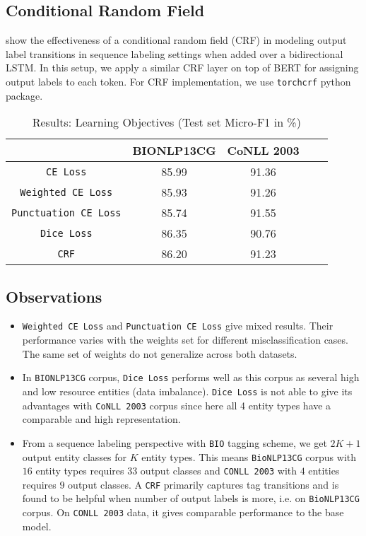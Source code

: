 \subsection{Conditional Random Field}
\cite{ma2016end} show the effectiveness of a conditional random field (CRF) in modeling output label transitions in sequence labeling settings when added over a bidirectional LSTM. In this setup, we apply a similar CRF layer on top of BERT for assigning output labels to each token. For CRF implementation, we use \texttt{torchcrf} python package.

\begin{table}[h!]
\centering
\begin{tabular}{|c|c|c|c|c|}\hline
	\textbf{} & \textbf{BIONLP13CG} & \textbf{CoNLL 2003}\\\hline
	\texttt{CE Loss} & 85.99 & 91.36\\\hline
	\texttt{Weighted CE Loss} & 85.93 & 91.26\\\hline
	\texttt{Punctuation CE Loss} & 85.74 & 91.55\\\hline
	\texttt{Dice Loss} & 86.35 & 90.76\\\hline
	\texttt{CRF} & 86.20 & 91.23\\\hline
	\end{tabular}
    \caption{Results: Learning Objectives (Test set Micro-F1 in \%)}
    \label{tab:res_loss}
\end{table}

\subsection{Observations}
\begin{itemize}
    \item \texttt{Weighted CE Loss} and \texttt{Punctuation CE Loss} give mixed results. Their performance varies with the weights set for different misclassification cases. The same set of weights do not generalize across both datasets.
    
    \item In \texttt{BIONLP13CG} corpus, \texttt{Dice Loss} performs well as this corpus as several high and low resource entities (data imbalance). \texttt{Dice Loss} is not able to give its advantages with \texttt{CoNLL 2003} corpus since here all 4 entity types have a comparable and high representation.
    
    \item From a sequence labeling perspective with \texttt{BIO} tagging scheme, we get $2K + 1$ output entity classes for $K$ entity types. This means \texttt{BioNLP13CG} corpus with $16$ entity types requires $33$ output classes and \texttt{CONLL 2003} with $4$ entities requires $9$ output classes. A \texttt{CRF} primarily captures tag transitions and is found to be helpful when number of output labels is more, i.e. on \texttt{BioNLP13CG} corpus. On \texttt{CONLL 2003} data, it gives comparable performance to the base model.
\end{itemize}

